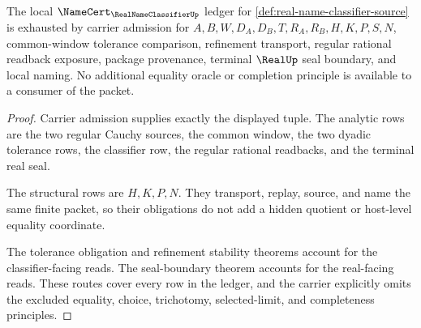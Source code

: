 \begin{theorem}
\label{thm:real-name-classifier-ledger-exhaustion}
The local $\NameCert_{\RealNameClassifierUp}$ ledger for \autoref{def:real-name-classifier-source} is exhausted by carrier admission for $A,B,W,D_A,D_B,T,R_A,R_B,H,K,P,S,N$, common-window tolerance comparison, refinement transport, regular rational readback exposure, package provenance, terminal $\RealUp$ seal boundary, and local naming. No additional equality oracle or completion principle is available to a consumer of the packet.
\end{theorem}
\begin{proof}
Carrier admission supplies exactly the displayed tuple. The analytic rows are the two regular Cauchy sources, the common window, the two dyadic tolerance rows, the classifier row, the regular rational readbacks, and the terminal real seal.

The structural rows are $H,K,P,N$. They transport, replay, source, and name the same finite packet, so their obligations do not add a hidden quotient or host-level equality coordinate.

The tolerance obligation and refinement stability theorems account for the classifier-facing reads. The seal-boundary theorem accounts for the real-facing reads. These routes cover every row in the ledger, and the carrier explicitly omits the excluded equality, choice, trichotomy, selected-limit, and completeness principles.
\end{proof}

